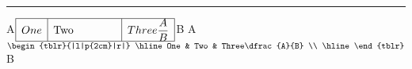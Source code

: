 \documentclass{article}
\begin{document}
\START
\hrule\bigskip

A$\begin{array}{|l|p{2cm}|r|}
\hline
One   &  Two  & Three\dfrac{A}{B} \\
\hline
\end{array}$B
A$\begin{tblr}{|l|p{2cm}|r|}
\hline
One   &  Two  & Three\dfrac{A}{B} \\
\hline
\end{tblr}$B
\ENDTEST
\end{document}
